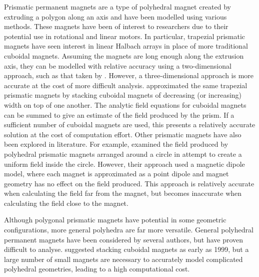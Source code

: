 Prismatic permanent magnets are a type of polyhedral magnet created by extruding a polygon along an axis and have been modelled using various methods. These magnets have been of interest to researchers due to their potential use in rotational and linear motors. In particular, trapezial prismatic magnets have seen interest in linear Halbach arrays in place of more traditional cuboidal magnets. Assuming the magnets are long enough along the extrusion axis, they can be modelled with relative accuracy using a two-dimensional approach, such as that taken by \textcite{Lee2004}. However, a three-dimensional approach is more accurate at the cost of more difficult analysis. \textcite{Meessen2008} approximated the same trapezial prismatic magnets by stacking cuboidal magnets of decreasing (or increasing) width on top of one another. The analytic field equations \cite{Akoun1984,Ravaud2009} for cuboidal magnets can be summed to give an estimate of the field produced by the prism. If a sufficient number of cuboidal magnets are used, this presents a relatively accurate solution at the cost of computation effort. Other prismatic magnets have also been explored in literature. For example, \textcite{Soltner2010} examined the field produced by polyhedral prismatic magnets arranged around a circle in attempt to create a uniform field inside the circle. However, their approach used a magnetic dipole model, where each magnet is approximated as a point dipole and magnet geometry has no effect on the field produced. This approach is relatively accurate when calculating the field far from the magnet, but becomes inaccurate when calculating the field close to the magnet.

Although polygonal prismatic magnets have potential in some geometric configurations, more general polyhedra are far more versatile. General polyhedral permanent magnets have been considered by several authors, but have proven difficult to analyse. \textcite{Bancel1999} suggested stacking cuboidal magnets as early as 1999, but a large number of small magnets are necessary to accurately model complicated polyhedral geometries, leading to a high computational cost.

